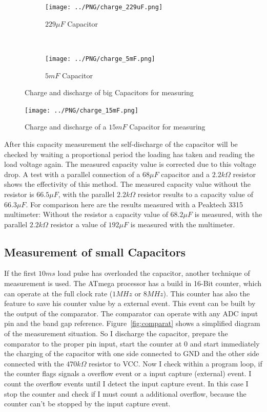 \begin{figure}[H]
  \begin{subfigure}[b]{9cm}
    \centering
    \texttt{[image: ../PNG/charge\_229uF.png]}
    \caption{\(229\mu F\) Capacitor}
    \label{pic:c229}
  \end{subfigure}
  ~
  \begin{subfigure}[b]{9cm}
    \centering
    \texttt{[image: ../PNG/charge\_5mF.png]}
    \caption{\(5mF\) Capacitor}
    \label{pic:c5mF}
  \end{subfigure}
  \caption{Charge and discharge of big Capacitors for measuring}
\end{figure}

\begin{figure}[H]
  \centering
    \texttt{[image: ../PNG/charge\_15mF.png]}
  \caption{Charge and discharge of a \(15mF\) Capacitor for measuring}
  \label{pic:c15mF}
\end{figure}

After this capacity measurement the self-discharge of the capacitor will be checked by
waiting a proportional period the loading has taken and reading the load voltage again.
The measured capacity value is corrected due to this voltage drop.
A test with a parallel connection of a \(68\mu F\) capacitor and a \(2.2k\Omega\) resistor shows
the effectivity of this method.
The measured capacity value without the resistor is \(66.5\mu F\),
with the parallel \(2.2k\Omega\) resistor results to a capacity value of \(66.3\mu F\).
For comparison here are the results measured with a Peaktech 3315 multimeter:
Without the resistor a capacity value of \(68.2\mu F\) is measured, with the
parallel \(2.2k\Omega\) resistor a value of \(192\mu F\) is measured with the multimeter.


\subsection{Measurement of small Capacitors}
If the first \(10ms\) load pulse has overloaded the capacitor, another technique of measurement is used.
The ATmega processor has a build in 16-Bit counter, which can operate at the full clock rate (\(1MHz\) or \(8MHz\)).
This counter has also the feature to save his counter value by a external event.
This event can be built by the output of the comparator. 
The comparator can operate with any ADC input pin and the band gap reference.
Figure~\ref{fig:comparat} shows a simplified diagram of the measurement situation.
So I discharge the capacitor, prepare the comparator to the proper pin input, start the counter at 0 and
start immediately the charging of the capacitor with one side connected to GND and the other side connected with
the \(470k\Omega\) resistor to VCC.
Now I check within a program loop, if the counter flags signals a overflow event or a input capture (external) event.
I count the overflow events until I detect the input capture event.
In this case I stop the counter and check if I must count a additional overflow,
because the counter can't be stopped by the input capture event.


